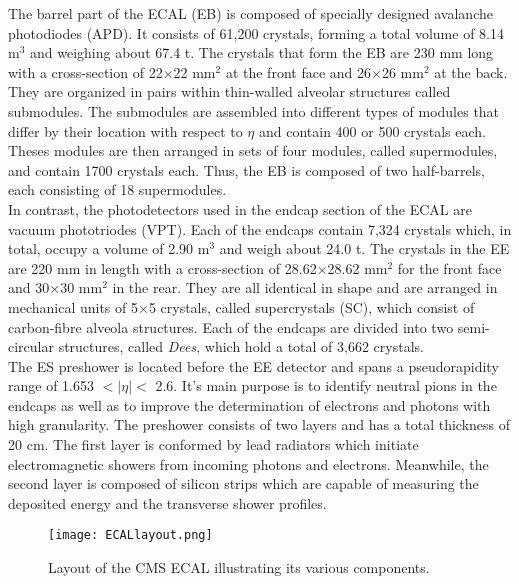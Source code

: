 The barrel part of the ECAL (EB) is composed of specially designed avalanche photodiodes (APD). It consists of 61,200 crystals, forming a total volume of 8.14 m$^3$ and weighing about 67.4 t. The crystals that form the EB are 230 mm long with a cross-section of 22$\times$22 mm$^2$ at the front face and 26$\times$26 mm$^2$ at the back. They are organized in pairs within thin-walled alveolar structures called submodules. The submodules are assembled into different types of modules that differ by their location with respect to $\eta$ and contain 400 or 500 crystals each. Theses modules are then arranged in sets of four modules, called supermodules, and contain 1700 crystals each. Thus, the EB is composed of two half-barrels, each consisting of 18 supermodules.\\

In contrast, the photodetectors used in the endcap section of the ECAL are vacuum phototriodes (VPT)\cite{VPT}. Each of the endcaps contain 7,324 crystals which, in total, occupy a volume of 2.90 m$^3$ and weigh about 24.0 t. The crystals in the EE are 220 mm in length with a cross-section of 28.62$\times$28.62 mm$^2$ for the front face and 30$\times$30 mm$^2$ in the rear. They are all identical in shape and are arranged in mechanical units of 5$\times$5 crystals, called supercrystals (SC), which consist of carbon-fibre alveola structures. Each of the endcaps are divided into two semi-circular structures, called \textit{Dees}, which hold a total of 3,662 crystals. \\

The ES preshower is located before the EE detector and spans a pseudorapidity range of 1.653 $< |\eta| <$ 2.6. It's main purpose is to identify neutral pions in the endcaps as well as to improve the determination of electrons and photons with high granularity. The preshower consists of two layers and has a total thickness of 20 cm. The first layer is conformed by lead radiators which initiate electromagnetic showers from incoming photons and electrons. Meanwhile, the second layer is composed of silicon strips which are capable of measuring the deposited energy and the transverse shower profiles.

\begin{figure}[tb]
\begin{center}
\texttt{[image: ECALlayout.png]} 
\caption{Layout of the CMS ECAL illustrating its various components\cite{CMSdet1}.}
\label{CMS_ECAL_Layout}
\vspace{-1em}
\end{center}
\end{figure}

